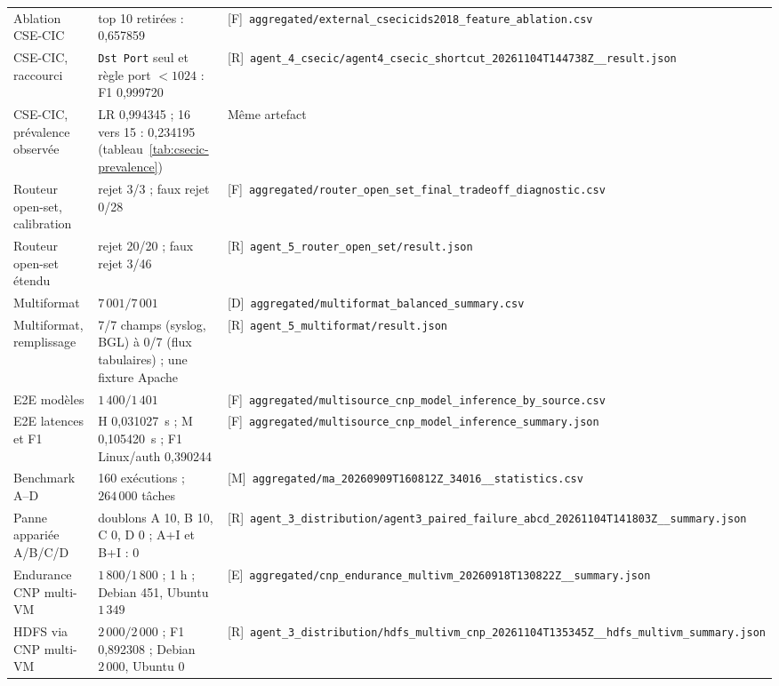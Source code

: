 \begin{longtable}{p{} p{} p{}}
Ablation CSE-CIC & top 10 retirées : 0,657859 & [F]~\texttt{aggregated/external\_csecicids2018\_feature\_ablation.csv} \\
CSE-CIC, raccourci & \texttt{Dst Port} seul et règle port $<1024$ : F1 0,999720 & [R]~\texttt{agent\_4\_csecic/agent4\_csecic\_shortcut\_20261104T144738Z\_\_result.json} \\
CSE-CIC, prévalence observée & LR 0,994345 ; 16 vers 15 : 0,234195 (tableau~\ref{tab:csecic-prevalence}) & Même artefact \\
Routeur open-set, calibration & rejet 3/3 ; faux rejet 0/28 & [F]~\texttt{aggregated/router\_open\_set\_final\_tradeoff\_diagnostic.csv} \\
Routeur open-set étendu & rejet 20/20 ; faux rejet 3/46 & [R]~\texttt{agent\_5\_router\_open\_set/result.json} \\
Multiformat & $7\,001/7\,001$ & [D]~\texttt{aggregated/multiformat\_balanced\_summary.csv} \\
Multiformat, remplissage & 7/7 champs (syslog, BGL) à 0/7 (flux tabulaires) ; une fixture Apache & [R]~\texttt{agent\_5\_multiformat/result.json} \\
E2E modèles & $1\,400/1\,401$ & [F]~\texttt{aggregated/multisource\_cnp\_model\_inference\_by\_source.csv} \\
E2E latences et F1 & H 0,031027~s ; M 0,105420~s ; F1 Linux/auth 0,390244 & [F]~\texttt{aggregated/multisource\_cnp\_model\_inference\_summary.json} \\
Benchmark A--D & 160 exécutions ; $264\,000$ tâches & [M]~\texttt{aggregated/ma\_20260909T160812Z\_34016\_\_statistics.csv} \\
Panne appariée A/B/C/D & doublons A 10, B 10, C 0, D 0 ; A+I et B+I : 0 & [R]~\texttt{agent\_3\_distribution/agent3\_paired\_failure\_abcd\_20261104T141803Z\_\_summary.json} \\
Endurance CNP multi-VM & $1\,800/1\,800$ ; 1 h ; Debian 451, Ubuntu $1\,349$ & [E]~\texttt{aggregated/cnp\_endurance\_multivm\_20260918T130822Z\_\_summary.json} \\
HDFS via CNP multi-VM & $2\,000/2\,000$ ; F1 0,892308 ; Debian $2\,000$, Ubuntu 0 & [R]~\texttt{agent\_3\_distribution/hdfs\_multivm\_cnp\_20261104T135345Z\_\_hdfs\_multivm\_summary.json} \\

\end{longtable}
